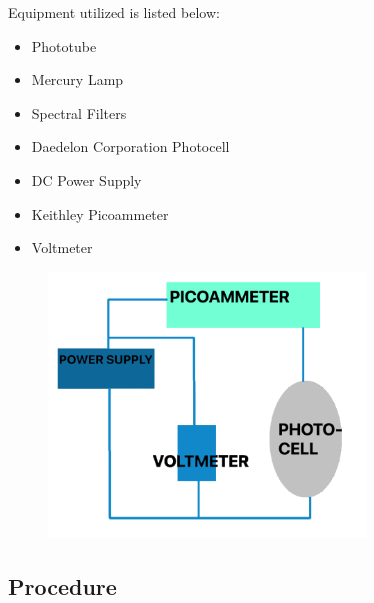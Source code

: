 \documentclass[a4paper]{article}
\begin{document}
Equipment utilized is listed below:

\begin{itemize}
\item Phototube 
\item Mercury Lamp 
\item Spectral Filters 
\item Daedelon Corporation Photocell 
\item DC Power Supply 
\item Keithley Picoammeter 
\item Voltmeter 
\end{itemize}

\begin{figure}[H]
\centering
\includegraphics[width=0.75\textwidth]{photo_circuit.png}
\label{photo_circuit}
\end{figure}

\newpage

\subsection{Procedure}

\end{document}
